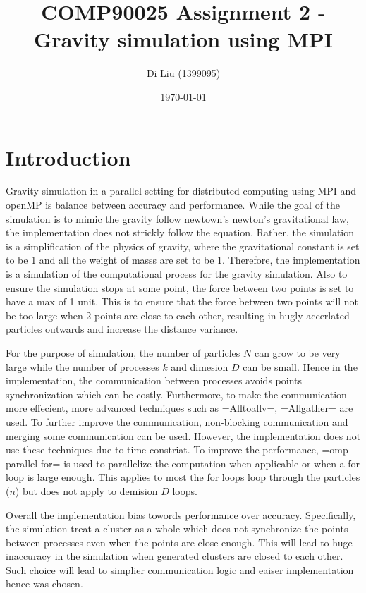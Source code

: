 \documentclass[12pt]{article}
\title{COMP90025 Assignment 2 - Gravity simulation using MPI}
\author{Di Liu (1399095)}
\date{\today}
\begin{document}
\maketitle

\section{Introduction}

Gravity simulation in a parallel setting
for distributed computing using MPI and openMP is balance between accuracy and
performance. While the goal of the simulation is to mimic the gravity follow newtown's
newton's gravitational law, the
implementation does not strickly follow the equation. Rather, the simulation
is a simplification of the physics of gravity, where the gravitational constant is
set to be 1 and all the weight of masss are set to be 1. Therefore, the implementation
is a simulation of the computational process for the gravity simulation.
Also to ensure the simulation stops at some point, the force between two points
is set to have a max of 1 unit. This is to ensure that the force between two points
will not be too large when 2 points are close to each other, resulting in hugly accerlated
particles outwards and increase the distance variance.

For the purpose of simulation, the number of particles $N$ can grow to be very large while
the number of processes $k$ and dimesion $D$ can be small.
Hence in the implementation, the communication between processes avoids points
synchronization which can be costly. Furthermore, to make the communication more
effecient, more advanced techniques such as =Alltoallv=, =Allgather= are used.
To further improve the communication, non-blocking communication and merging
some communication can be used. However, the implementation does not use these
techniques due to time constriat. To improve the performance, =omp parallel for=
is used to parallelize the computation when applicable or when a for loop is large enough.
This applies to most the for loops loop through the particles ($n$) but does not apply
to demision $D$ loops.

Overall the implementation bias towords performance over accuracy.
Specifically, the simulation treat a cluster as a whole which does not
synchronize the points between processes even when the points are close enough.
This will lead to huge inaccuracy in the simulation
when generated clusters are closed to each other. Such choice will lead to
simplier communication logic and eaiser implementation hence was chosen.
\end{document}
